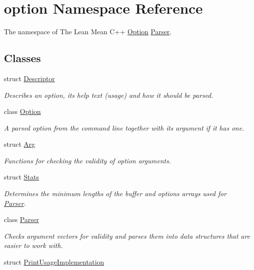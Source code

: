 \hypertarget{namespaceoption}{\section{option \-Namespace \-Reference}
\label{namespaceoption}
}


\-The namespace of \-The \-Lean \-Mean \-C++ \hyperlink{classoption_1_1_option}{\-Option} \hyperlink{classoption_1_1_parser}{\-Parser}.  


\subsection*{\-Classes}
\begin{DoxyCompactItemize}
\item 
struct \hyperlink{structoption_1_1_descriptor}{\-Descriptor}
\begin{DoxyCompactList}\small\item\em \-Describes an option, its help text (usage) and how it should be parsed. \end{DoxyCompactList}\item 
class \hyperlink{classoption_1_1_option}{\-Option}
\begin{DoxyCompactList}\small\item\em \-A parsed option from the command line together with its argument if it has one. \end{DoxyCompactList}\item 
struct \hyperlink{structoption_1_1_arg}{\-Arg}
\begin{DoxyCompactList}\small\item\em \-Functions for checking the validity of option arguments. \end{DoxyCompactList}\item 
struct \hyperlink{structoption_1_1_stats}{\-Stats}
\begin{DoxyCompactList}\small\item\em \-Determines the minimum lengths of the buffer and options arrays used for \hyperlink{classoption_1_1_parser}{\-Parser}. \end{DoxyCompactList}\item 
class \hyperlink{classoption_1_1_parser}{\-Parser}
\begin{DoxyCompactList}\small\item\em \-Checks argument vectors for validity and parses them into data structures that are easier to work with. \end{DoxyCompactList}\item 
struct \hyperlink{structoption_1_1_print_usage_implementation}{\-Print\-Usage\-Implementation}
\end{DoxyCompactItemize}
